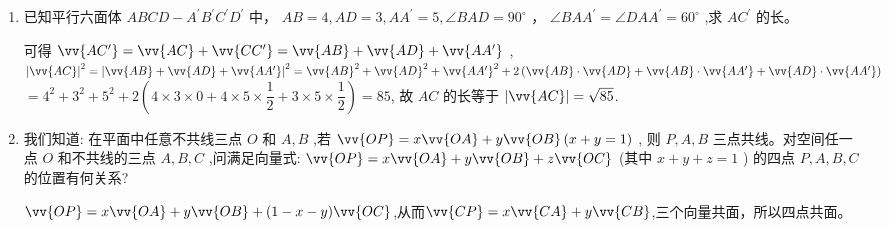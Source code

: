 \begin{enumerate}
\begin{jieda}
    \begin{enumerate}
        \item $ \because $ 四边形 $ {ABCD} $ 是平行四边形, $ \therefore \vv{AC} = \vv{AB} + \vv{AD} $ ,
$ \because \vv{EG} = \vv{OG} - \vv{OE} $ ,
$ = k \cdot  \vv{OC} - k \cdot  \vv{OA} = k\left( {\vv{OC} - \vv{OA}}\right)  = k\vv{AC} = k\left( {\vv{AB} + \vv{AD}}\right) $
$ = k\left( {\vv{OB} - \vv{OA} + \vv{OD} - \vv{OA}}\right)  = \vv{OF} - \vv{OE} + \vv{OH} - \vv{OE} = \vv{EF} + \vv{EH} $
$ \therefore E $ 、 $ F $ 、 $ G $ 、 $ H $ 四点共面;
    \item $ \because \vv{EF} = \vv{OF} - \vv{OE} = k\left( {\vv{OB} - \vv{OA}}\right)  = k \cdot  \vv{AB},\therefore {EF}\parallel {AB} $
又因为 $ {EF} ⊄ $ 平面 $ {ABCD} $ , $ {AB} \subset $ 平面 $ {ABCD} $ ,所以 $ {EF}// $ 平面 $ {ABCD} $
又 $ \because \vv{EG} = k \cdot  \vv{AC},\therefore {EG}\parallel {AC} $ ,
$ {EG} ⊄ $ 平面 $ {ABCD},{AC} \subset $ 平面 $ {ABCD},{EG} \parallel $ 平面 $ {ABCD} $ ,
又 $ {EF} \cap  {EG} = E,{EF},{EG} \subset $ 平面 $ {EG} $
所以,平面 $ {EG} \parallel $ 平面 $ {AC} $
    \end{enumerate}.
    
\end{jieda}



\item 已知平行六面体 ${ABCD} - {A}^{\prime }{B}^{\prime }{C}^{\prime }{D}^{\prime }$ 中， ${AB} = 4,{AD} = 3,{AA}^{\prime } = 5,\angle {BAD} = {90}^{ \circ  }$ ， $\angle {BA}{A}^{\prime } = \angle {DA}{A}^{\prime } = {60}^{ \circ  }$ ,求 $A{C}^{\prime }$ 的长。

\begin{jieda}
可得 $ \vv{A{C}^{\prime }} = \vv{AC} + \vv{C{C}^{\prime }} = \vv{AB} + \vv{AD} + \vv{A{A}^{\prime }} $ ,
$ {\left| \vv{AC}\right| }^{2} = {\left| \vv{AB} + \vv{AD} + \vv{A{A}^{\prime }}\right| }^{2} = {\vv{AB}}^{2} + {\vv{AD}}^{2} + {\vv{AA'}}^{2}+2\left( {\vv{AB} \cdot  \vv{AD} + \vv{AB} \cdot  \vv{A{A}^{\prime }} + \vv{AD} \cdot  \vv{A{A}^{\prime }}}\right) $
$ = {4}^{2} + {3}^{2} + {5}^{2} + 2\left( {4 \times  3 \times  0 + 4 \times  5 \times  \dfrac{1}{2} + 3 \times  5 \times  \dfrac{1}{2}}\right)  = {85} $,
故 $ {AC} $ 的长等于 $ \left| \vv{AC}\right|  = \sqrt{85} $.
\end{jieda}

\item 我们知道: 在平面中任意不共线三点 $O$ 和 $A,B$ ,若 $\vv{OP} = x\vv{OA} + y\vv{OB}\left( {x + y = 1}\right)$ , 则 $P,A,B$ 三点共线。对空间任一点 $O$ 和不共线的三点 $A,B,C$ ,问满足向量式: $\vv{OP} = x\vv{OA} + y\vv{OB} + z\vv{OC}$ (其中 $x + y + z = 1$ ) 的四点 $P,A,B,C$ 的位置有何关系?
\begin{jieda}
    $\vv{OP}=x\vv{OA}+y\vv{OB}+(1-x-y)\vv{OC}$,从而$\vv{CP}=x\vv{CA}+y\vv{CB}$,三个向量共面，所以四点共面。
\end{jieda}

\end{enumerate}




